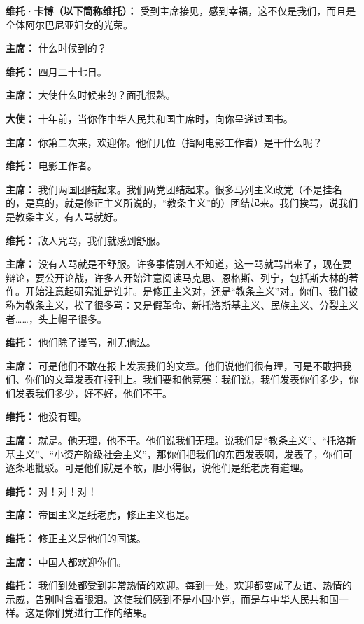 \begin{list}{}
\item[\textbf{维托·卡博（以下筒称维托）：}]{受到主席接见，感到幸福，这不仅是我们，而且是全体阿尔巴尼亚妇女的光荣。}
\item[\textbf{主席：}]{什么时候到的？} 
\item[\textbf{维托：}]{四月二十七日。}
\item[\textbf{主席：}]{大使什么时候来的？面孔很熟。}
\item[\textbf{大使：}]{十年前，当你作中华人民共和国主席时，向你呈递过国书。}
\item[\textbf{主席：}]{你第二次来，欢迎你。他们几位（指阿电影工作者）是干什么呢？}
\item[\textbf{维托：}]{电影工作者。}
\item[\textbf{主席：}]{我们两国团结起来。我们两党团结起来。很多马列主义政党（不是挂名的，是真的，就是修正主义所说的，“教条主义”的）团结起来。我们挨骂，说我们是教条主义，有人骂就好。}
\item[\textbf{维托：}]{敌人咒骂，我们就感到舒服。}
\item[\textbf{主席：}]没有人骂就是不舒服。许多事情别人不知道，这一骂就骂出来了，现在要辩论，要公开论战，许多人开始注意阅读马克思、恩格斯、列宁，包括斯大林的著作。开始注意起研究谁是谁非。是修正主义对，还是“教条主义”对。你们、我们被称为教条主义，挨了很多骂：{又是假革命、新托洛斯基主义、民族主义、分裂主义者……，头上帽子很多。}
\item[\textbf{维托：}]{他们除了谩骂，别无他法。}
\item[\textbf{主席：}]{可是他们不敢在报上发表我们的文章。他们说他们很有理，可是不敢把我们、你们的文章发表在报刊上。我们要和他竞赛：我们说，我们发表你们多少，你们发表我们多少，好不好，他们不干。}
\item[\textbf{维托：}]{他没有理。}
\item[\textbf{主席：}]{就是。他无理，他不干。他们说我们无理。说我们是“教条主义”、“托洛斯基主义”、“小资产阶级社会主义”，那你们把我们的东西发表啊，发表了，你们可逐条地批驳。可是他们就是不敢，胆小得很，说他们是纸老虎有道理。}
\item[\textbf{维托：}]{对！对！对！}
\item[\textbf{主席：}]{帝国主义是纸老虎，修正主义也是。}
\item[\textbf{维托：}]{修正主义是他们的同谋。}
\item[\textbf{主席：}]{中国人都欢迎你们。}
\item[\textbf{维托：}]{我们到处都受到非常热情的欢迎。每到一处，欢迎都变成了友谊、热情的示威，告别时含着眼泪。这使我们感到不是小国小党，而是与中华人民共和国一样。这是你们党进行工作的结果。}

\end{list}
